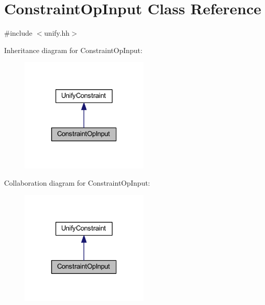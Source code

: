 \hypertarget{class_constraint_op_input}{}\section{Constraint\+Op\+Input Class Reference}
\label{class_constraint_op_input}


{\ttfamily \#include $<$unify.\+hh$>$}



Inheritance diagram for Constraint\+Op\+Input\+:
\nopagebreak
\begin{figure}[H]
\begin{center}
\leavevmode
\includegraphics[width=175pt]{class_constraint_op_input__inherit__graph}
\end{center}
\end{figure}


Collaboration diagram for Constraint\+Op\+Input\+:
\nopagebreak
\begin{figure}[H]
\begin{center}
\leavevmode
\includegraphics[width=175pt]{class_constraint_op_input__coll__graph}
\end{center}
\end{figure}
